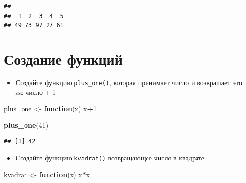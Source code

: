 \documentclass[]{book}
\newenvironment{Shaded}{\begin{snugshade}}{\end{snugshade}}
\newcommand{\KeywordTok}[1]{\textcolor[rgb]{0.13,0.29,0.53}{\textbf{#1}}}
\newcommand{\DecValTok}[1]{\textcolor[rgb]{0.00,0.00,0.81}{#1}}
\newcommand{\StringTok}[1]{\textcolor[rgb]{0.31,0.60,0.02}{#1}}
\newcommand{\ControlFlowTok}[1]{\textcolor[rgb]{0.13,0.29,0.53}{\textbf{#1}}}
\newcommand{\OperatorTok}[1]{\textcolor[rgb]{0.81,0.36,0.00}{\textbf{#1}}}
\newcommand{\NormalTok}[1]{#1}
\providecommand{\tightlist}{%
  \setlength{\itemsep}{0pt}\setlength{\parskip}{0pt}}
\begin{document}
\begin{Shaded}
\end{Shaded}

\begin{verbatim}
## 
##  1  2  3  4  5 
## 49 73 97 27 61
\end{verbatim}

\section{Создание функций}\label{solvtask_function}

\begin{itemize}
\tightlist
\item
  Создайте функцию \texttt{plus\_one()}, которая принимает число и
  возвращает это же число + 1
\end{itemize}

\begin{Shaded}
\begin{Highlighting}[]
\NormalTok{plus_one <-}\StringTok{ }\ControlFlowTok{function}\NormalTok{(x) x}\OperatorTok{+}\DecValTok{1}
\end{Highlighting}
\end{Shaded}

\begin{Shaded}
\begin{Highlighting}[]
\KeywordTok{plus_one}\NormalTok{(}\DecValTok{41}\NormalTok{)}
\end{Highlighting}
\end{Shaded}

\begin{verbatim}
## [1] 42
\end{verbatim}

\begin{itemize}
\tightlist
\item
  Создайте функцию \texttt{kvadrat()} возвращающее число в квадрате
\end{itemize}

\begin{Shaded}
\begin{Highlighting}[]
\NormalTok{kvadrat <-}\StringTok{ }\ControlFlowTok{function}\NormalTok{(x) x}\OperatorTok{*}\NormalTok{x}
\end{Highlighting}
\end{Shaded}
\end{document}
